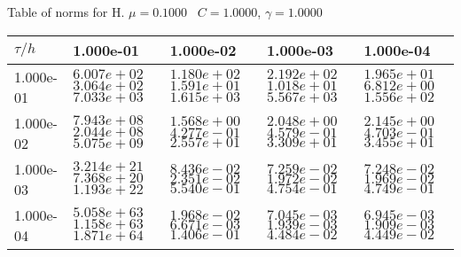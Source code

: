 \begin{center}
Table of norms for H. $\mu = 0.1000$ \, $C = 1.0000$, $\gamma = 1.0000$
  
\begin{tabular}{|p{1in}|p{1in}|p{1in}|p{1in}|p{1in}|} \hline
$\tau / h$ &1.000e-01 &1.000e-02 &1.000e-03 &1.000e-04 \\ \hline 
1.000e-01 & $6.007e+02$  $3.064e+02$  $7.033e+03$  & $1.180e+02$  $1.591e+01$  $1.615e+03$  & $2.192e+02$  $1.018e+01$  $5.567e+03$  & $1.965e+01$  $6.812e+00$  $1.556e+02$  \\ \hline 
1.000e-02 & $7.943e+08$  $2.044e+08$  $5.075e+09$  & $1.568e+00$  $4.277e-01$  $2.557e+01$  & $2.048e+00$  $4.579e-01$  $3.309e+01$  & $2.145e+00$  $4.703e-01$  $3.455e+01$  \\ \hline 
1.000e-03 & $3.214e+21$  $7.368e+20$  $1.193e+22$  & $8.436e-02$  $2.351e-02$  $5.540e-01$  & $7.259e-02$  $1.972e-02$  $4.754e-01$  & $7.248e-02$  $1.969e-02$  $4.749e-01$  \\ \hline 
1.000e-04 & $5.058e+63$  $1.158e+63$  $1.871e+64$  & $1.968e-02$  $6.671e-03$  $1.406e-01$  & $7.045e-03$  $1.939e-03$  $4.484e-02$  & $6.945e-03$  $1.909e-03$  $4.449e-02$  \\ \hline 

\end{tabular}\\[20pt]
\end{center}
